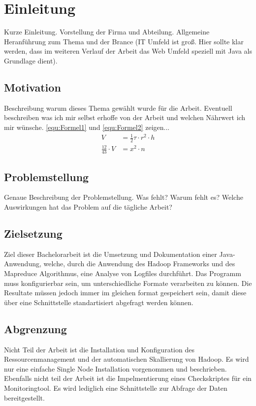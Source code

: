 
\chapter{Einleitung}\label{cha:Einleitung}
Kurze Einleitung. Vorstellung der Firma und Abteilung. Allgemeine Heranführung zum Thema und der Brance (IT Umfeld ist groß. Hier sollte klar werden, dass im weiteren Verlauf der Arbeit das Web Umfeld speziell mit Java als Grundlage dient).

\section{Motivation}\label{sec:Motivation}
Beschreibung warum dieses Thema gewählt wurde für die Arbeit. Eventuell beschreiben was ich mir selbst erhoffe von der Arbeit und welchen Nährwert ich mir wünsche. \autoref{equ:Formel1} und \ref{equ:Formel2} zeigen...
\begin{align}
V & = \frac{1}{2} \tau \cdot r^{2} \cdot h
\label{equ:Formel1} \\
\frac{12}{43} \cdot V & = x^2 \cdot n
\label{equ:Formel2}
\end{align}

\section{Problemstellung}\label{sec:Problemstellung}


Genaue Beschreibung der Problemstellung. Was fehlt? Warum fehlt es? Welche Auswirkungen hat das Problem auf die tägliche Arbeit?

\section{Zielsetzung}\label{sec:Zielsetzung}
Ziel dieser Bachelorarbeit ist die Umsetzung und Dokumentation einer Java-Anwendung, welche, durch die Anwendung des Hadoop Frameworks und des Mapreduce Algorithmus, eine Analyse von Logfiles durchführt. Das Programm muss konfigurierbar sein, um unterschiedliche Formate verarbeiten zu können. Die  Resultate müssen jedoch immer im gleichen format gespeichert sein, damit diese über eine Schnittstelle standartisiert abgefragt werden können.



\section{Abgrenzung}\label{sec:Abgrenzung}
Nicht Teil der Arbeit ist die Installation und Konfiguration des Ressourcenmanagement und der automatischen Skallierung von Hadoop. Es wird nur eine einfache Single Node Installation vorgenommen und beschrieben. Ebenfalls nicht teil der Arbeit ist die Impelmentierung eines Checkskriptes für ein Monitoringtool. Es wird lediglich eine Schnittstelle zur Abfrage der Daten bereitgestellt.

